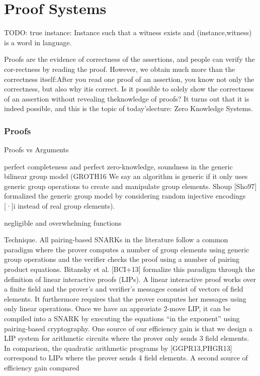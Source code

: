 \chapter{Proof Systems }

TODO: true instance: Instance such that a witness exists and (instance,witness) is a word in language.

Proofs are the evidence of correctness of the assertions, and people can verify the cor-rectness by reading the proof. However, we obtain much more than the correctness itself:After you read one proof of an assertion, you know not only the correctness, but also why itis correct. Is it possible to solely show the correctness of an assertion without revealing theknowledge of proofs? It turns out that it is indeed possible, and this is the topic of today’slecture: Zero Knowledge Systems.

\subsection{Proofs}
Proofs vs Arguments

perfect completeness and perfect zero-knowledge, soundness in the generic bilinear group model (GROTH16 We say an algorithm is generic if it only uses generic group operations to create
and manipulate group elements. Shoup [Sho97] formalized the generic group model by
considering random injective encodings [·]i
instead of real group elements).

negligible and overwhelming functions

Technique. All pairing-based SNARKs in the literature follow a common paradigm
where the prover computes a number of group elements using generic group operations
and the verifier checks the proof using a number of pairing product equations. Bitansky
et al. [BCI+13] formalize this paradigm through the definition of linear interactive proofs
(LIPs). A linear interactive proof works over a finite field and the prover’s and verifier’s
messages consist of vectors of field elements. It furthermore requires that the prover
computes her messages using only linear operations. Once we have an approriate 2-move
LIP, it can be compiled into a SNARK by executing the equations “in the exponent”
using pairing-based cryptography. One source of our efficiency gain is that we design
a LIP system for arithmetic circuits where the prover only sends 3 field elements. In
comparison, the quadratic arithmetic programs by [GGPR13,PHGR13] correspond to
LIPs where the prover sends 4 field elements.
A second source of efficiency gain compared



